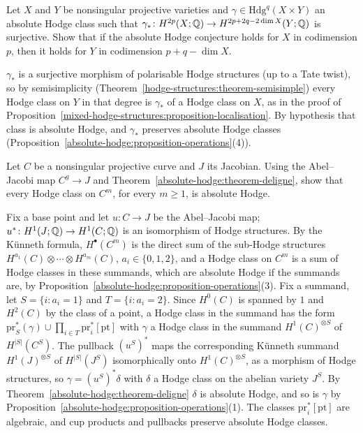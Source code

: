 \begin{exercise}\label{absolute-hodge:exercise-correspondence}
Let $X$ and $Y$ be nonsingular projective varieties and $\gamma \in \mathrm{Hdg}^q(X \times Y)$ an absolute Hodge class such that $\gamma_* \colon H^{2p}(X; \mathbb{Q}) \to H^{2p+2q-2\dim X}(Y; \mathbb{Q})$ is surjective.
Show that if the absolute Hodge conjecture holds for $X$ in codimension $p$, then it holds for $Y$ in codimension $p + q - \dim X$.
\end{exercise}

\begin{solution}
$\gamma_*$ is a surjective morphism of polarisable Hodge structures (up to a Tate twist), so by semisimplicity (Theorem~\ref{hodge-structures:theorem-semisimple}) every Hodge class on $Y$ in that degree is
$\gamma_*$ of a Hodge class on $X$, as in the proof of Proposition~\ref{mixed-hodge-structures:proposition-localisation}. By hypothesis that class is absolute Hodge, and $\gamma_*$ preserves absolute Hodge classes
(Proposition~\ref{absolute-hodge:proposition-operations}(4)).
\end{solution}

\begin{exercise}\label{absolute-hodge:exercise-product-abelian}
Let $C$ be a nonsingular projective curve and $J$ its Jacobian. Using the Abel--Jacobi map $C^g \to J$ and Theorem~\ref{absolute-hodge:theorem-deligne}, show that every Hodge class on $C^m$, for every
$m \geq 1$, is absolute Hodge.
\end{exercise}

\begin{solution}
Fix a base point and let $u \colon C \to J$ be the Abel--Jacobi map; $u^* \colon H^1(J; \mathbb{Q}) \to H^1(C; \mathbb{Q})$ is an isomorphism of Hodge structures. By the K\"unneth formula, $H^\bullet(C^m)$ is the direct sum of the
sub-Hodge structures $H^{a_1}(C) \otimes \cdots \otimes H^{a_m}(C)$, $a_i \in \{0, 1, 2\}$, and a Hodge class on $C^m$ is a sum of Hodge classes in these summands, which are absolute Hodge if the summands are,
by Proposition~\ref{absolute-hodge:proposition-operations}(3). Fix a summand, let $S = \{i : a_i = 1\}$ and $T = \{i : a_i = 2\}$. Since $H^0(C)$ is spanned by $1$ and $H^2(C)$ by the class of a point, a Hodge class in
the summand has the form $\mathrm{pr}_S^*(\gamma) \cup \prod_{i \in T}\mathrm{pr}_i^*[\mathrm{pt}]$ with $\gamma$ a Hodge class in the summand $H^1(C)^{\otimes S}$ of $H^{|S|}(C^S)$. The pullback $(u^S)^*$ maps the
corresponding K\"unneth summand $H^1(J)^{\otimes S}$ of $H^{|S|}(J^S)$ isomorphically onto $H^1(C)^{\otimes S}$, as a morphism of Hodge structures, so $\gamma = (u^S)^*\delta$ with $\delta$ a Hodge class on the abelian
variety $J^S$. By Theorem~\ref{absolute-hodge:theorem-deligne} $\delta$ is absolute Hodge, and so is $\gamma$ by Proposition~\ref{absolute-hodge:proposition-operations}(1). The classes $\mathrm{pr}_i^*[\mathrm{pt}]$ are
algebraic, and cup products and pullbacks preserve absolute Hodge classes.
\end{solution}

